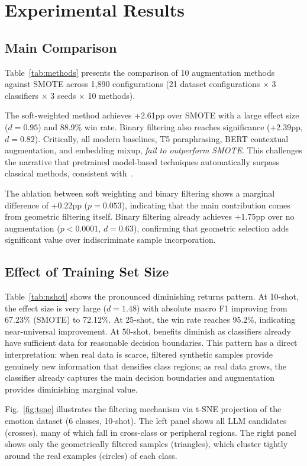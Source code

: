 \documentclass[conference]{IEEEtran}
\begin{document}
\section{Experimental Results}

\subsection{Main Comparison}

Table~\ref{tab:methods} presents the comparison of 10 augmentation methods against SMOTE across 1,890 configurations (21 dataset configurations $\times$ 3 classifiers $\times$ 3 seeds $\times$ 10 methods).

The soft-weighted method achieves +2.61pp over SMOTE with a large effect size ($d=0.95$) and 88.9\% win rate. Binary filtering also reaches significance (+2.39pp, $d=0.82$). Critically, all modern baselines, T5 paraphrasing, BERT contextual augmentation, and embedding mixup, \textit{fail to outperform SMOTE}. This challenges the narrative that pretrained model-based techniques automatically surpass classical methods, consistent with~\cite{cegin2025llms}.

The ablation between soft weighting and binary filtering shows a marginal difference of +0.22pp ($p=0.053$), indicating that the main contribution comes from geometric filtering itself. Binary filtering already achieves +1.75pp over no augmentation ($p<0.0001$, $d=0.63$), confirming that geometric selection adds significant value over indiscriminate sample incorporation.

\subsection{Effect of Training Set Size}
Table~\ref{tab:nshot} shows the pronounced diminishing returns pattern. At 10-shot, the effect size is very large ($d=1.48$) with absolute macro F1 improving from 67.23\% (SMOTE) to 72.12\%. At 25-shot, the win rate reaches 95.2\%, indicating near-universal improvement. At 50-shot, benefits diminish as classifiers already have sufficient data for reasonable decision boundaries. This pattern has a direct interpretation: when real data is scarce, filtered synthetic samples provide genuinely new information that densifies class regions; as real data grows, the classifier already captures the main decision boundaries and augmentation provides diminishing marginal value.

Fig.~\ref{fig:tsne} illustrates the filtering mechanism via t-SNE projection of the emotion dataset (6 classes, 10-shot). The left panel shows all LLM candidates (crosses), many of which fall in cross-class or peripheral regions. The right panel shows only the geometrically filtered samples (triangles), which cluster tightly around the real examples (circles) of each class.
\end{document}
